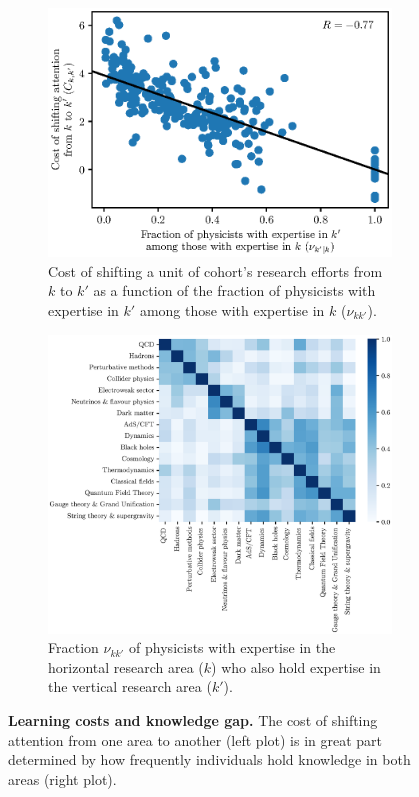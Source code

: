 \documentclass{article}
\begin{document}
\begin{figure}[h]
\begin{subfigure}{.45\textwidth}
    \centering
    \includegraphics[width=1.15\textwidth]{plots/cost_vs_nu_knowledge.eps}
    \caption{Cost of shifting a unit of cohort's research efforts from $k$ to $k'$ as a function of the fraction of physicists with expertise in $k'$ among those with expertise in $k$ ($\nu_{kk'}$).}
    \label{fig:cost_knowledge}
\end{subfigure}\hfill%
\begin{subfigure}{0.45\textwidth}
    \centering
    \includegraphics[width=1.15\textwidth]{plots/ei_R_control.eps}
    \caption{Fraction $\nu_{kk'}$ of physicists with expertise in the horizontal research area ($k$) who also hold expertise in the vertical research area ($k'$).}
    \label{fig:nu}
\end{subfigure}
\caption{\textbf{Learning costs and knowledge gap.} The cost of shifting attention from one area to another (left plot) is in great part determined by how frequently individuals hold knowledge in both areas (right plot).}
\label{fig:knowledge}
\end{figure}
\end{document}

